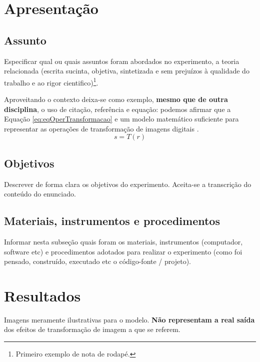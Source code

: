 \documentclass[11pt, a4paper]{article}
\begin{document}
\begin{twocolumn}
\section*{Apresentação}
\subsection*{Assunto}
Especificar qual ou quais assuntos foram abordados no experimento, a teoria relacionada (escrita sucinta, objetiva, sintetizada e sem prejuízos à qualidade do trabalho e ao rigor cientifico)\footnote{Primeiro exemplo de nota de rodapé.}.

Aproveitando o contexto deixa-se como exemplo, \textbf{mesmo que de outra disciplina}, o uso de citação, referência e equação: podemos afirmar que a Equação \ref{eq:eqOperTransformacao} e um modelo matemático suficiente para representar as operações de transformação de imagens digitais \cite{GonzalezWoods}.
    \begin{equation}
        s=T(r)
        \label{eq:eqOperTransformacao}
    \end{equation}
\subsection*{Objetivos}
Descrever de forma clara os objetivos do experimento. Aceita-se a transcrição do conteúdo do enunciado.
\subsection*{Materiais, instrumentos e procedimentos}
Informar nesta subseção quais foram os materiais, instrumentos (computador, software etc) e procedimentos adotados para realizar o experimento (como foi pensado, construído, executado etc o código-fonte / projeto).
\section*{Resultados}
Imagens meramente ilustrativas para o modelo. \textbf{Não representam a real saída} dos efeitos de transformação de imagem a que se referem.


\end{twocolumn}
\end{document}
